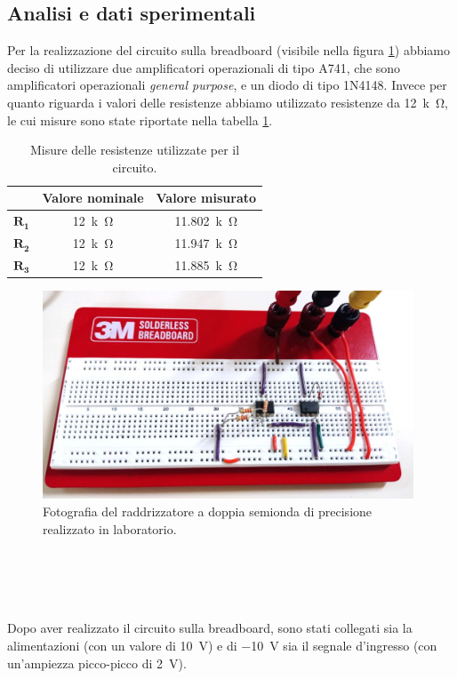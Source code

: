 \documentclass{report}
\begin{document}
\subsection{Analisi e dati sperimentali}
Per la realizzazione del circuito sulla breadboard (visibile nella figura \ref{figura:circuito1}) abbiamo deciso di utilizzare due amplificatori operazionali di tipo \textmu A741, che sono amplificatori operazionali \textit{general purpose}, e un diodo di tipo 1N4148.
Invece per quanto riguarda i valori delle resistenze abbiamo utilizzato resistenze da \SI{12}{k\ohm}, le cui misure sono state riportate nella tabella \ref{table:mis_res1}.
\begin{table}[h!]
	\centering
	\begin{tabular}{|c|c|c|}
		\cline{2-3} 
		\multicolumn{1}{c|}{} & \textbf{Valore nominale} & \textbf{Valore misurato}\\ 
		\hline
		$\mathbf{R_1}$ & \SI{12}{k\ohm} & \SI{11.802}{k\ohm} \\ 
		\hline
		$\mathbf{R_2}$ & \SI{12}{k\ohm} & \SI{11.947}{k\ohm} \\ 
		\hline
		$\mathbf{R_3}$ & \SI{12}{k\ohm} & \SI{11.885}{k\ohm} \\ 
		\hline
	\end{tabular}
	\caption{Misure delle resistenze utilizzate per il circuito.}
	\label{table:mis_res1}
\end{table}
\begin{figure}[h]
	\centering
	\includegraphics[height=6.2cm]{immagini/circuito1}
	\caption{Fotografia del raddrizzatore a doppia semionda di precisione realizzato in laboratorio.}
	\label{figura:circuito1}
\end{figure}
\\\\\\
\\Dopo aver realizzato il circuito sulla breadboard, sono stati collegati sia la alimentazioni (con un valore di \SI{+10}{\volt}) e di \SI{-10}{\volt} sia il segnale d'ingresso (con un'ampiezza picco-picco di \SI{2}{\volt}).
\end{document}
